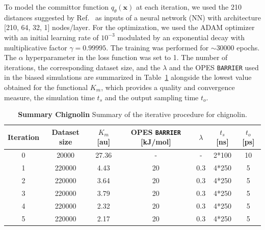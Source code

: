             To model the committor function $q_\theta(\textbf{x})$ at each iteration, we used the 210 distances suggested by Ref.~ as inputs of a neural network (NN) with architecture  [210, 64, 32, 1] nodes/layer.
            For the optimization, we used the ADAM optimizer with an initial learning rate of $10^{-3}$ modulated by an exponential decay with multiplicative factor $\gamma=0.99995$. 
            The training was performed for $\sim$30000 epochs. The $\alpha$ hyperparameter in the loss function was set to 1.
            The number of iterations, the corresponding dataset size, and the $\lambda$ and the OPES \texttt{BARRIER} used in the biased simulations are summarized in Table~\ref{sup_tab:chignolin_iterations} alongside the lowest value obtained for the functional $K_m$, which provides a quality and convergence measure, the simulation time $t_s$ and the output sampling time $t_o$.
            \begin {table}[h!]
                \caption {\textbf{Summary Chignolin} Summary of the iterative procedure for chignolin.} \label{sup_tab:chignolin_iterations}
                \begin{center}
                \begin{tabular}{ |c|c|c|c|c|c|c| } 
                 \hline
                 Iteration & Dataset size & $K_m$ [au] & OPES \texttt{BARRIER} [kJ/mol] & $\lambda$ & $t_s$ [ns] & $t_o$ [ps] \\ 
                 \hline
                    0   & 20000 &  27.36  & -& -     & 2*100 & 10\\
                    1   & 220000 &  4.43 & 20& 0.3  & 4*250 & 5\\
                    2   & 220000 &  3.64 & 20& 0.3  & 4*250 & 5\\
                    3   & 220000 &  3.79 & 20& 0.3  & 4*250 & 5\\
                    4   & 220000 &  2.32 & 20& 0.3  & 4*250 & 5\\
                    5   & 220000 &  2.17 & 20& 0.3  & 4*250 & 5\\   
                 \hline
                \end{tabular}
                \end{center}
            \end {table}

